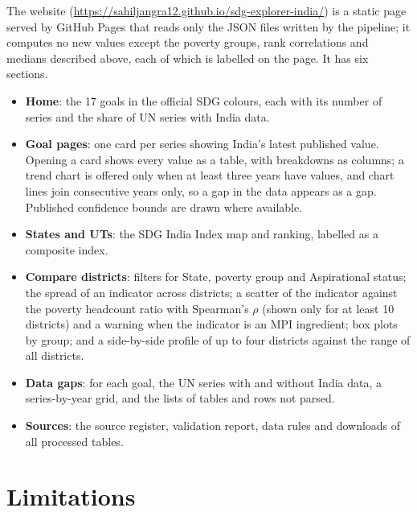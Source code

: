 \documentclass[11pt,a4paper]{article}
\begin{document}
The website (\url{https://sahiljangra12.github.io/sdg-explorer-india/}) is a static page served by GitHub Pages that reads only the JSON files written by the pipeline; it computes no new values except the poverty groups, rank correlations and medians described above, each of which is labelled on the page. It has six sections.
\begin{itemize}
  \item \textbf{Home}: the 17 goals in the official SDG colours, each with its number of series and the share of UN series with India data.
  \item \textbf{Goal pages}: one card per series showing India's latest published value. Opening a card shows every value as a table, with breakdowns as columns; a trend chart is offered only when at least three years have values, and chart lines join consecutive years only, so a gap in the data appears as a gap. Published confidence bounds are drawn where available.
  \item \textbf{States and UTs}: the SDG India Index map and ranking, labelled as a composite index.
  \item \textbf{Compare districts}: filters for State, poverty group and Aspirational status; the spread of an indicator across districts; a scatter of the indicator against the poverty headcount ratio with Spearman's $\rho$ (shown only for at least 10 districts) and a warning when the indicator is an MPI ingredient; box plots by group; and a side-by-side profile of up to four districts against the range of all districts.
  \item \textbf{Data gaps}: for each goal, the UN series with and without India data, a series-by-year grid, and the lists of tables and rows not parsed.
  \item \textbf{Sources}: the source register, validation report, data rules and downloads of all processed tables.
\end{itemize}

\section{Limitations}\label{sec:limits}
\end{document}
